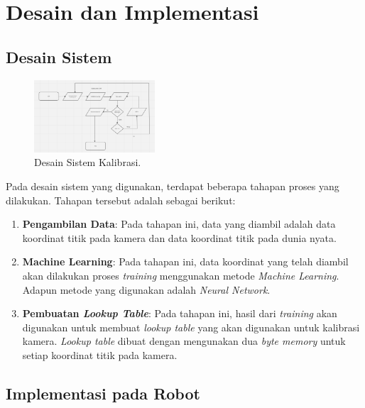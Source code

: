 \section{Desain dan Implementasi}
\label{sec:desaindanimplementasi}

\subsection{Desain Sistem}
\label{subsec:desainsistem}

\begin{figure} [ht]
  \centering
  \includegraphics[width=0.4\textwidth]{gambar/desain_sistem.png}

  \caption{Desain Sistem Kalibrasi.}
  \label{fig:desainsistem}
\end{figure}

Pada desain sistem yang digunakan, terdapat beberapa tahapan proses yang dilakukan. Tahapan tersebut adalah sebagai berikut:

\begin{enumerate}
  \item \textbf{Pengambilan Data}: Pada tahapan ini, data yang diambil adalah data koordinat titik pada kamera dan data koordinat titik pada dunia nyata.
  \item \textbf{Machine Learning}: Pada tahapan ini, data koordinat yang telah diambil akan dilakukan proses \emph{training} menggunakan metode \emph{Machine Learning}. Adapun metode yang digunakan adalah \emph{Neural Network}.
  \item \textbf{Pembuatan \emph{Lookup Table}}: Pada tahapan ini, hasil dari \emph{training} akan digunakan untuk membuat \emph{lookup table} yang akan digunakan untuk kalibrasi kamera. \emph{Lookup table} dibuat dengan mengunakan dua \emph{byte memory} untuk setiap koordinat titik pada kamera.
\end{enumerate}

\subsection{Implementasi pada Robot}
\label{subsec:implementasi}

